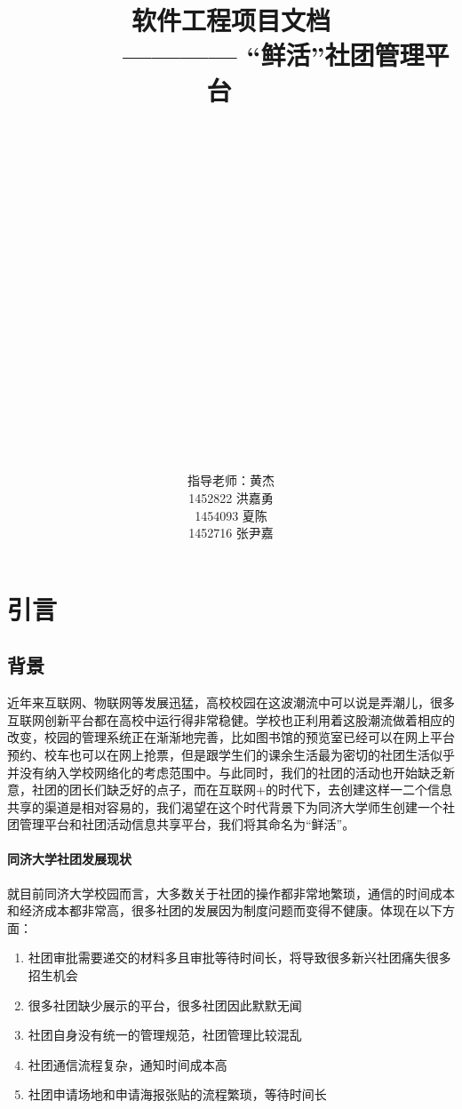 \documentclass[UTF8]{ctexart}
\title{\Huge \textbf{软件工程项目文档}  \\
\large ~~~~~~~ ———— “鲜活”社团管理平台
 ~\\ ~\\ ~\\ ~\\ ~\\ ~\\ ~\\ ~\\ ~\\ ~\\ ~\\}
\author{
\large 指导老师：黄杰 \\
\large 1452822 洪嘉勇 \\
\large 1454093 夏陈   \\
\large 1452716 张尹嘉 \\
}
\begin{document}
\maketitle




\newpage
\tableofcontents
\newpage

\section{引言}
\subsection{背景}
近年来互联网、物联网等发展迅猛，高校校园在这波潮流中可以说是弄潮儿，很多互联网创新平台都在高校中运行得非常稳健。学校也正利用着这股潮流做着相应的改变，校园的管理系统正在渐渐地完善，比如图书馆的预览室已经可以在网上平台预约、校车也可以在网上抢票，但是跟学生们的课余生活最为密切的社团生活似乎并没有纳入学校网络化的考虑范围中。与此同时，我们的社团的活动也开始缺乏新意，社团的团长们缺乏好的点子，而在互联网+的时代下，去创建这样一二个信息共享的渠道是相对容易的，我们渴望在这个时代背景下为同济大学师生创建一个社团管理平台和社团活动信息共享平台，我们将其命名为“鲜活”。
\paragraph{同济大学社团发展现状}
就目前同济大学校园而言，大多数关于社团的操作都非常地繁琐，通信的时间成本和经济成本都非常高，很多社团的发展因为制度问题而变得不健康。体现在以下方面：

\begin{enumerate}[1)]
\item 社团审批需要递交的材料多且审批等待时间长，将导致很多新兴社团痛失很多招生机会
\item 很多社团缺少展示的平台，很多社团因此默默无闻
\item 社团自身没有统一的管理规范，社团管理比较混乱
\item 社团通信流程复杂，通知时间成本高
\item 社团申请场地和申请海报张贴的流程繁琐，等待时间长
\end{enumerate}
\end{document}
